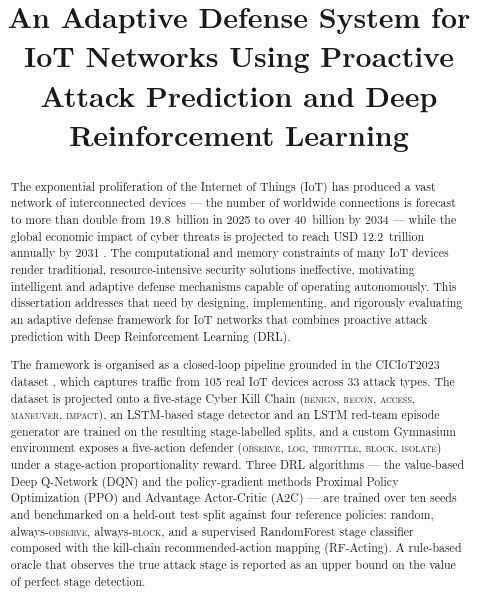 \documentclass[Ingles,Final]{thesis}
\begin{document}
\title{An Adaptive Defense System for IoT Networks Using Proactive Attack Prediction and Deep Reinforcement Learning}


\qualificacaoMestrado
{}



\paginasiniciais

\begin{abstract}
The exponential proliferation of the Internet of Things (IoT) has produced a vast network of interconnected devices --- the number of worldwide connections is forecast to more than double from 19.8~billion in 2025 to over 40~billion by 2034 \cite{Statista2025} --- while the global economic impact of cyber threats is projected to reach USD 12.2~trillion annually by 2031 \cite{Morgan2025}. The computational and memory constraints of many IoT devices render traditional, resource-intensive security solutions ineffective, motivating intelligent and adaptive defense mechanisms capable of operating autonomously. This dissertation addresses that need by designing, implementing, and rigorously evaluating an adaptive defense framework for IoT networks that combines proactive attack prediction with Deep Reinforcement Learning (DRL).

The framework is organised as a closed-loop pipeline grounded in the CICIoT2023 dataset \cite{Neto2023}, which captures traffic from 105 real IoT devices across 33 attack types. The dataset is projected onto a five-stage Cyber Kill Chain (\textsc{benign}, \textsc{recon}, \textsc{access}, \textsc{maneuver}, \textsc{impact}), an LSTM-based stage detector and an LSTM red-team episode generator are trained on the resulting stage-labelled splits, and a custom Gymnasium environment exposes a five-action defender (\textsc{observe}, \textsc{log}, \textsc{throttle}, \textsc{block}, \textsc{isolate}) under a stage-action proportionality reward. Three DRL algorithms --- the value-based Deep Q-Network (DQN) and the policy-gradient methods Proximal Policy Optimization (PPO) and Advantage Actor-Critic (A2C) --- are trained over ten seeds and benchmarked on a held-out test split against four reference policies: random, always-\textsc{observe}, always-\textsc{block}, and a supervised RandomForest stage classifier composed with the kill-chain recommended-action mapping (RF-Acting). A rule-based oracle that observes the true attack stage is reported as an upper bound on the value of perfect stage detection.


\end{abstract}
\end{document}
